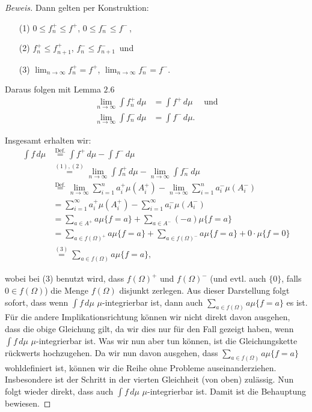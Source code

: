 \documentclass[10pt]{article}
\begin{document}
\begin{proof}[Beweis]
		Dann gelten per Konstruktion:
		\begin{itemize}
			\item[(1)] $0\leq f_n^+ \leq f^{+}$, $0\leq f_n^- \leq f^{-}$\,,
			\item[(2)] $f_n^+ \leq f_{n+1}^+$, $f_n^- \leq f_{n+1}^-$\, und
			\item[(3)] $\lim_{n\to\infty} f_n^{+} = f^{+}$, $\lim_{n\to\infty} f_n^{-} = f^{-}$.
		\end{itemize}

		Daraus folgen mit Lemma $2.6$ 
		\begin{align}
			\lim_{n\to\infty} \int f_n^{+} \,d\mu &= \int f^{+} \,d\mu \quad \text{ und} \\
			\lim_{n\to\infty} \int f_n^{-} \,d\mu &= \int f^{-} \,d\mu. 
		\end{align}

		Insgesamt erhalten wir:
		\begin{align*}
			\int f\,d\mu &\overset{\text{Def.}}{=} \int f^+\,d\mu - \int f^-\,d\mu \\
						 &\overset{(1),(2)}{=} \lim_{n\to\infty} \int f_n^{+} \,d\mu - \lim_{n\to\infty} \int f_n^{-} \,d\mu \\
						 &\overset{\text{Def.}}{=}  \lim_{n\to\infty}\sum_{i=1}^{n} a_i^{+}\mu(A_i^+) - \lim_{n\to\infty}\sum_{i=1}^{n} a_i^{-}\mu(A_i^-) \\
						 &= \sum_{i=1}^{\infty} a_i^{+}\mu(A_i^+) - \sum_{i=1}^{\infty} a_i^{-}\mu(A_i^-) \\
						 &= \sum_{a\in A^+} a\mu\{f = a\} + \sum_{a\in A^-} (-a)\mu\{f = a\} \\
						 &= \sum_{a\in f(\Omega)^+} a\mu\{f = a\} + \sum_{a\in f(\Omega)^-} a\mu\{f = a\} + 0\cdot \mu\{f = 0\}\\
						 &\overset{(3)}{=} \sum_{a\in f(\Omega)} a \mu\{f = a\},
		\end{align*}

		wobei bei (3) benutzt wird, dass $f(\Omega)^+$ und $f(\Omega)^-$
		(und evtl. auch $\{0\}$, falls $0\in f(\Omega)$) die Menge $f(\Omega)$ disjunkt zerlegen.  
		Aus dieser Darstellung folgt sofort, dass wenn $\int f\,d\mu$ $\mu$-integrierbar ist, dann auch
		$\sum_{a\in f(\Omega)} a \mu\{f = a\}$ es ist. Für die andere Implikationsrichtung können wir 
		nicht direkt davon ausgehen, dass die obige Gleichung gilt, da wir dies nur für den Fall gezeigt haben, 
		wenn $\int f\,d\mu$ $\mu$-integrierbar ist. Was wir nun aber tun können, ist die Gleichungskette rückwerts 
		hochzugehen. Da wir nun davon ausgehen, dass $\sum_{a\in f(\Omega)} a \mu\{f = a\}$ wohldefiniert ist, 
		können wir die Reihe ohne Probleme auseinanderziehen. Insbesondere ist der Schritt in der vierten Gleichheit 
		(von oben) zulässig.
		Nun folgt wieder direkt, dass auch $\int f\,d\mu$ $\mu$-integrierbar ist. 
		Damit ist die Behauptung bewiesen.
	\end{proof}
\end{document}
